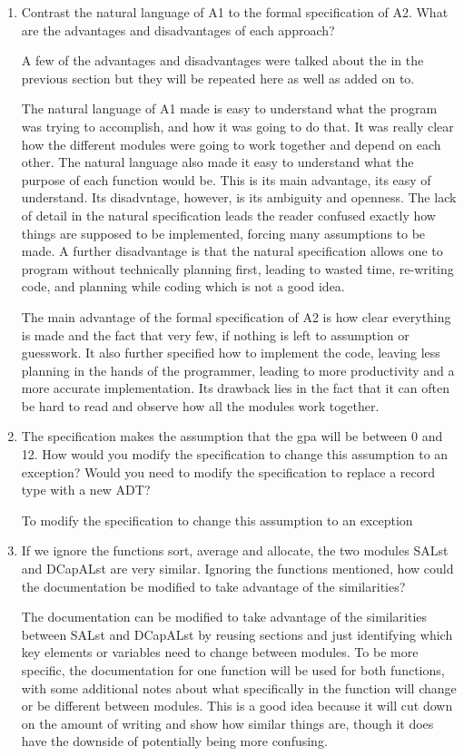 \documentclass[12pt]{article}
\begin{document}
\begin{enumerate}

\item Contrast the natural language of A1 to the formal specification of A2.
What are the advantages and disadvantages of each approach?

A few of the advantages and disadvantages were talked about the in the previous
section but they will be repeated here as well as added on to.

The natural language of A1 made is easy to understand what the program was
trying to accomplish, and how it was going to do that. It was really clear
how the different modules were going to work together and depend on each
other. The natural language also made it easy to understand what the purpose
of each function would be. This is its main advantage, its easy of understand.
Its disadvntage, however, is its ambiguity and openness. The lack of detail
in the natural specification leads the reader confused exactly how things
are supposed to be implemented, forcing many assumptions to be made. A further
disadvantage is that the natural specification allows one to program without
technically planning first, leading to wasted time, re-writing code,
and planning while coding which is not a good idea.

The main advantage of the formal specification of A2 is how clear everything is
made and the fact that very few, if nothing is left to assumption or guesswork.
It also further specified how to implement the code, leaving less planning
in the hands of the programmer, leading to more productivity and a more accurate
implementation. Its drawback lies in the fact that it can often be hard to read
and observe how all the modules work together.

\item The specification makes the assumption that the gpa will be between 0 and 12.
How would you modify the specification to change this assumption to an exception?
Would you need to modify the specification to replace a record type with a new ADT?

To modify the specification to change this assumption to an exception

\item If we ignore the functions sort, average and allocate, the two modules SALst and DCapALst
are very similar. Ignoring the functions mentioned, how could the documentation be modified 
to take advantage of the similarities?

The documentation can be modified to take advantage of the similarities between SALst and DCapALst 
by reusing sections and just identifying which key elements or variables need to change between modules.
To be more specific, the documentation for one function will be used for both functions, with some additional
notes about what specifically in the function will change or be different between modules. This is a good idea because 
it will cut down on the amount of writing and show how similar things are, though it does have the downside of potentially 
being more confusing.


\end{enumerate}
\end{document}
